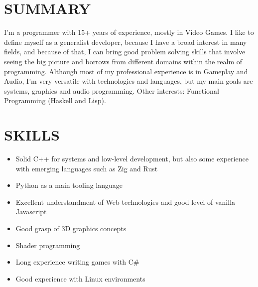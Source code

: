 \documentclass[line,margin]{res}
\begin{document}

\address{Düsseldorf - Germany}
\address{bruno@croci.me - \href{https://bruno.croci.me/}{https://bruno.croci.me/}}

 
\begin{resume}
 
  \section{SUMMARY} I'm a programmer with 15+ years of experience, mostly in Video Games. I like to define myself as a generalist developer, because I have a broad interest in many fields, and because of that, I can bring good problem solving skills that involve seeing the big picture and borrows from different domains within the realm of programming. Although most of my professional experience is in Gameplay and Audio, I'm very versatile with technologies and languages, but my main goals are systems, graphics and audio programming. Other interests: Functional Programming (Haskell and Lisp).
 
\section{SKILLS}
        \begin{itemize}  \itemsep 1.25pt
                \item Solid C++ for systems and low-level development, but also some experience with emerging languages such as Zig and Rust
                \item Python as a main tooling language
                \item Excellent understandment of Web technologies and good level of vanilla Javascript
                \item Good grasp of 3D graphics concepts
                \item Shader programming
                \item Long experience writing games with C\#
                \item Good experience with Linux environments
        \end{itemize}
 

\end{resume}
\end{document}
